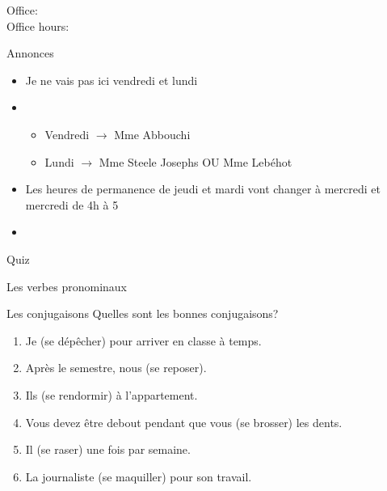 \documentclass{beamer}
\subtitle[Verbes pronominaux]{Les verbes pronominaux}
\begin{document}
  \begin{frame}
    \titlepage
    \tiny{Office: \\
          Office hours: }
  \end{frame}

  \begin{frame}{Annonces}
    \begin{itemize}
      \item Je ne vais pas ici vendredi et lundi
      \item[] 
      \begin{itemize}
        \item Vendredi $\to$ Mme Abbouchi
        \item Lundi $\to$ Mme Steele Josephs OU Mme Lebéhot
      \end{itemize}
      \item Les heures de permanence de jeudi et mardi vont changer à mercredi et mercredi de 4h à 5
      \item[] 
    \end{itemize}
  \end{frame}

  \begin{frame}{}
    \begin{center}
      \Large Quiz
    \end{center}
  \end{frame}

  \begin{frame}{Les verbes pronominaux}
    \begin{center}
      
    \end{center}
  \end{frame}

  \begin{frame}{Les conjugaisons}
    Quelles sont les bonnes conjugaisons? \\
    \begin{enumerate}
      \item Je \underline{} (se dépêcher) pour arriver en classe à temps.
      \item Après le semestre, nous \underline{} (se reposer).
      \item Ils \underline{} (se rendormir) à l'appartement.
      \item Vous devez être debout pendant que vous \underline{} (se brosser) les dents.
      \item Il \underline{} (se raser) une fois par semaine.
      \item La journaliste \underline{} (se maquiller) pour son travail.
    \end{enumerate}
  \end{frame}
\end{document}
